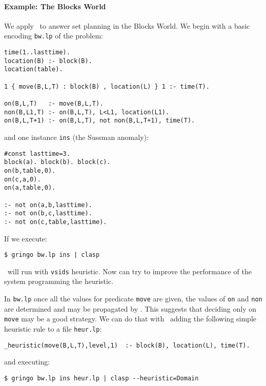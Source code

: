 \paragraph{Example: The Blocks World}

 We apply \clasp\ to answer set planning in the Blocks World.  We begin with a basic encoding \texttt{bw.lp} of the problem:
\begin{lstlisting}[numbers=none]
time(1..lasttime).
location(B) :- block(B).
location(table).

1 { move(B,L,T) : block(B) , location(L) } 1 :- time(T).

on(B,L,T)   :- move(B,L,T).
non(B,L1,T) :- on(B,L,T), L<L1, location(L1).
on(B,L,T+1) :- on(B,L,T), not non(B,L,T+1), time(T). \end{lstlisting}

 and one instance \texttt{ins} (the Sussman anomaly):
\begin{lstlisting}[numbers=none]
#const lasttime=3.
block(a). block(b). block(c).
on(b,table,0).
on(c,a,0).
on(a,table,0).

:- not on(a,b,lasttime).
:- not on(b,c,lasttime).
:- not on(c,table,lasttime).
\end{lstlisting}

If we execute:
\begin{lstlisting}[numbers=none]
$ gringo bw.lp ins | clasp \end{lstlisting}

\clasp\ will run with \texttt{vsids} heuristic. Now can try to improve the performance of the system programming the heuristic.

 In \texttt{bw.lp} once all the values for predicate \texttt{move} are given,
 the values of \texttt{on} and \texttt{non} are determined and may be propagated by \clasp.
 This suggests that deciding only on \texttt{move} may be a good strategy.
 We can do that with \clasp\ adding the following simple heuristic rule to a file \texttt{heur.lp}:

\begin{lstlisting}[numbers=none]
_heuristic(move(B,L,T),level,1)  :- block(B), location(L), time(T).\end{lstlisting}

and executing:
\begin{lstlisting}[numbers=none]
$ gringo bw.lp ins heur.lp | clasp --heuristic=Domain \end{lstlisting}

